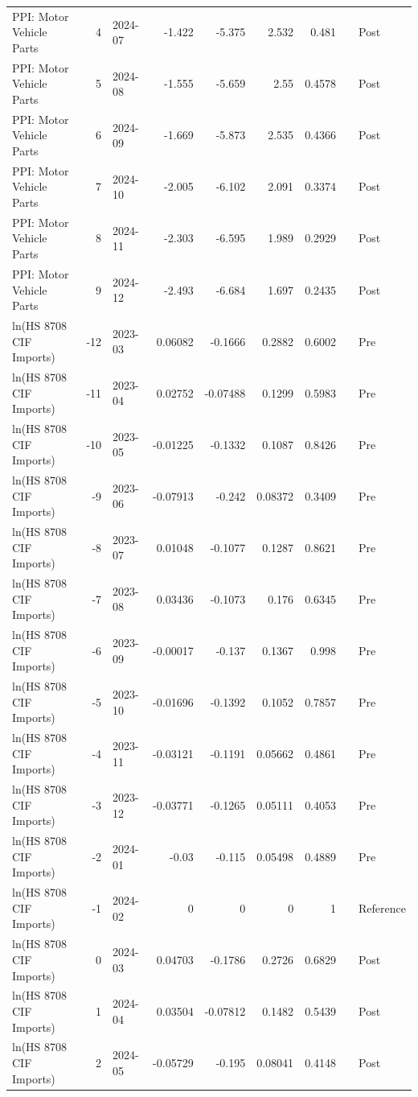 \begin{table}
\begin{tabular}{lrlrrrrll}
PPI: Motor Vehicle Parts & 4 & 2024-07 & -1.422 & -5.375 & 2.532 & 0.481 &  & Post \\
PPI: Motor Vehicle Parts & 5 & 2024-08 & -1.555 & -5.659 & 2.55 & 0.4578 &  & Post \\
PPI: Motor Vehicle Parts & 6 & 2024-09 & -1.669 & -5.873 & 2.535 & 0.4366 &  & Post \\
PPI: Motor Vehicle Parts & 7 & 2024-10 & -2.005 & -6.102 & 2.091 & 0.3374 &  & Post \\
PPI: Motor Vehicle Parts & 8 & 2024-11 & -2.303 & -6.595 & 1.989 & 0.2929 &  & Post \\
PPI: Motor Vehicle Parts & 9 & 2024-12 & -2.493 & -6.684 & 1.697 & 0.2435 &  & Post \\
ln(HS 8708 CIF Imports) & -12 & 2023-03 & 0.06082 & -0.1666 & 0.2882 & 0.6002 &  & Pre \\
ln(HS 8708 CIF Imports) & -11 & 2023-04 & 0.02752 & -0.07488 & 0.1299 & 0.5983 &  & Pre \\
ln(HS 8708 CIF Imports) & -10 & 2023-05 & -0.01225 & -0.1332 & 0.1087 & 0.8426 &  & Pre \\
ln(HS 8708 CIF Imports) & -9 & 2023-06 & -0.07913 & -0.242 & 0.08372 & 0.3409 &  & Pre \\
ln(HS 8708 CIF Imports) & -8 & 2023-07 & 0.01048 & -0.1077 & 0.1287 & 0.8621 &  & Pre \\
ln(HS 8708 CIF Imports) & -7 & 2023-08 & 0.03436 & -0.1073 & 0.176 & 0.6345 &  & Pre \\
ln(HS 8708 CIF Imports) & -6 & 2023-09 & -0.00017 & -0.137 & 0.1367 & 0.998 &  & Pre \\
ln(HS 8708 CIF Imports) & -5 & 2023-10 & -0.01696 & -0.1392 & 0.1052 & 0.7857 &  & Pre \\
ln(HS 8708 CIF Imports) & -4 & 2023-11 & -0.03121 & -0.1191 & 0.05662 & 0.4861 &  & Pre \\
ln(HS 8708 CIF Imports) & -3 & 2023-12 & -0.03771 & -0.1265 & 0.05111 & 0.4053 &  & Pre \\
ln(HS 8708 CIF Imports) & -2 & 2024-01 & -0.03 & -0.115 & 0.05498 & 0.4889 &  & Pre \\
ln(HS 8708 CIF Imports) & -1 & 2024-02 & 0 & 0 & 0 & 1 &  & Reference \\
ln(HS 8708 CIF Imports) & 0 & 2024-03 & 0.04703 & -0.1786 & 0.2726 & 0.6829 &  & Post \\
ln(HS 8708 CIF Imports) & 1 & 2024-04 & 0.03504 & -0.07812 & 0.1482 & 0.5439 &  & Post \\
ln(HS 8708 CIF Imports) & 2 & 2024-05 & -0.05729 & -0.195 & 0.08041 & 0.4148 &  & Post \\

\end{tabular}
\end{table}
